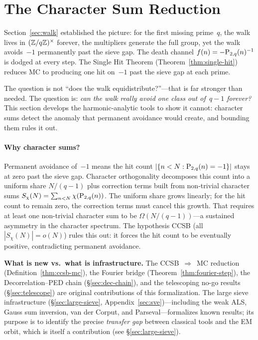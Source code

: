 \section{The Character Sum Reduction}
\label{sec:character}

Section~\ref{sec:walk} established the picture: for the first
missing prime~$q$, the walk lives in $(\mathbb{Z}/q\mathbb{Z})^\times$ forever, the
multipliers generate the full group, yet the walk avoids~$-1$
permanently past the sieve gap.  The death channel
$f(n) = -\mathrm{P}_{2,q}(n)^{-1}$ is dodged at every step.  The Single Hit
Theorem (Theorem~\ref{thm:single-hit}) reduces MC to producing one hit
on~$-1$ past the sieve gap at each prime.

The question is not ``does the walk equidistribute?''---that is far
stronger than needed.  The question is: \emph{can the walk really
avoid one class out of~$q{-}1$ forever?}  This section develops the
harmonic-analytic tools to show it cannot: character sums detect the
anomaly that permanent avoidance would create, and bounding them rules
it out.

\paragraph{Why character sums?}
Permanent avoidance of~$-1$ means the hit count
$|\{n < N : \mathrm{P}_{2,q}(n) = -1\}|$ stays at zero past the sieve gap.
Character orthogonality decomposes this count into a uniform share
$N/(q{-}1)$ plus correction terms built from non-trivial character
sums $S_\chi(N) = \sum_{n<N}\chi(\mathrm{P}_{2,q}(n))$.  The uniform share
grows linearly; for the hit count to remain zero, the correction terms
must cancel this growth.  That requires at least one non-trivial
character sum to be $\Omega(N/(q{-}1))$---a sustained asymmetry in
the character spectrum.  The hypothesis CCSB (all $|S_\chi(N)| =
o(N)$) rules this out: it forces the hit count to be eventually
positive, contradicting permanent avoidance.

\medskip\noindent\textbf{What is new vs.\ what is infrastructure.}\enspace
The CCSB~$\Rightarrow$~MC reduction (Definition~\ref{thm:ccsb-mc}),
the Fourier bridge (Theorem~\ref{thm:fourier-step}), the
Decorrelation--PED chain (\S\ref{sec:dec-chain}), and the telescoping
no-go results (\S\ref{sec:telescope}) are original contributions of
this formalization.  The large sieve infrastructure
(\S\ref{sec:large-sieve}, Appendix~\ref{sec:sve})---including the weak ALS,
Gauss sum inversion, van der Corput, and Parseval---formalizes known
results; its purpose is to identify the precise \emph{transfer gap}
between classical tools and the EM orbit, which is itself a
contribution (see \S\ref{sec:large-sieve}).

